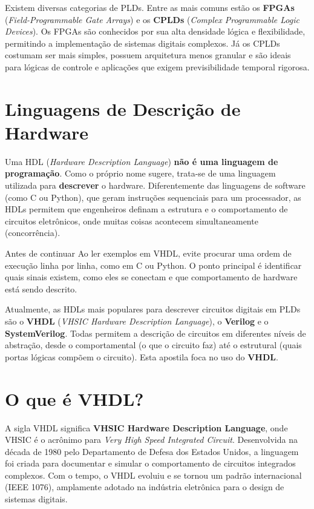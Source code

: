 Existem diversas categorias de PLDs. Entre as mais comuns estão os \textbf{FPGAs} (\textit{Field-Programmable Gate Arrays}) e os \textbf{CPLDs} (\textit{Complex Programmable Logic Devices}). Os FPGAs são conhecidos por sua alta densidade lógica e flexibilidade, permitindo a implementação de sistemas digitais complexos. Já os CPLDs costumam ser mais simples, possuem arquitetura menos granular e são ideais para lógicas de controle e aplicações que exigem previsibilidade temporal rigorosa.

\section{Linguagens de Descrição de Hardware}

Uma HDL (\textit{Hardware Description Language}) \textbf{não é uma linguagem de programação}. Como o próprio nome sugere, trata-se de uma linguagem utilizada para \textbf{descrever} o hardware. Diferentemente das linguagens de software (como C ou Python), que geram instruções sequenciais para um processador, as HDLs permitem que engenheiros definam a estrutura e o comportamento de circuitos eletrônicos, onde muitas coisas acontecem simultaneamente (concorrência).

\begin{observacao}{Antes de continuar}
Ao ler exemplos em VHDL, evite procurar uma ordem de execução linha por linha, como em C ou Python. O ponto principal é identificar quais sinais existem, como eles se conectam e que comportamento de hardware está sendo descrito.
\end{observacao}

Atualmente, as HDLs mais populares para descrever circuitos digitais em PLDs são o \textbf{VHDL} (\textit{VHSIC Hardware Description Language}), o \textbf{Verilog} e o \textbf{SystemVerilog}. Todas permitem a descrição de circuitos em diferentes níveis de abstração, desde o comportamental (o que o circuito faz) até o estrutural (quais portas lógicas compõem o circuito). Esta apostila foca no uso do \textbf{VHDL}.

\section{O que é VHDL?}

A sigla VHDL significa \textbf{VHSIC Hardware Description Language}, onde VHSIC é o acrônimo para \textit{Very High Speed Integrated Circuit}. Desenvolvida na década de 1980 pelo Departamento de Defesa dos Estados Unidos, a linguagem foi criada para documentar e simular o comportamento de circuitos integrados complexos. Com o tempo, o VHDL evoluiu e se tornou um padrão internacional (IEEE 1076), amplamente adotado na indústria eletrônica para o design de sistemas digitais.

